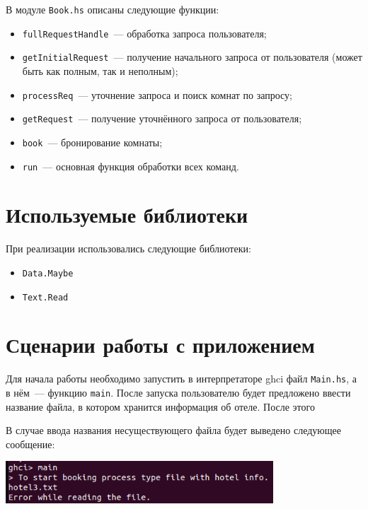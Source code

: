 \documentclass[oneside,final,14pt]{extarticle}
\begin{document}
В модуле \texttt{Book.hs} описаны следующие функции:
\begin{itemize}
    \item \texttt{fullRequestHandle}~--- обработка запроса пользователя;
    \item \texttt{getInitialRequest}~--- получение начального запроса от пользователя
    (может быть как полным, так и неполным);
    \item \texttt{processReq}~--- уточнение запроса и поиск комнат по запросу;
    \item \texttt{getRequest}~--- получение уточнённого запроса от 
    пользователя;
    \item \texttt{book}~--- бронирование комнаты;
    \item \texttt{run}~--- основная функция обработки всех команд.
\end{itemize}

\section{Используемые библиотеки}

При реализации использовались следующие библиотеки:
\begin{itemize}
    \item \texttt{Data.Maybe}
    \item \texttt{Text.Read} 
\end{itemize}

\section{Сценарии работы с приложением}

Для начала работы необходимо запустить в интерпретаторе ghci файл 
\texttt{Main.hs}, а в нём~--- функцию \texttt{main}.
После запуска пользователю будет предложено ввести название файла, в котором 
хранится информация об отеле. После этого 

В случае ввода названия несуществующего файла будет выведено следующее сообщение:
\begin{center}
    \includegraphics[width=0.75\textwidth]{picture03.png}
\end{center}
\end{document}
